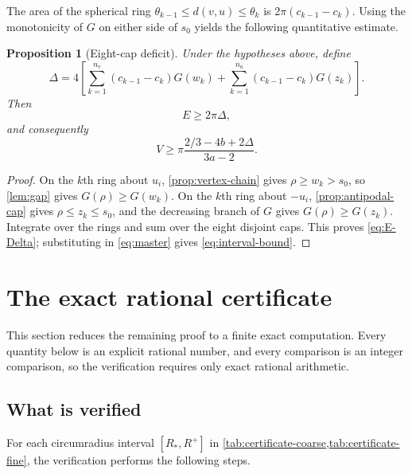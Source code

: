 \documentclass[11pt,reqno]{amsart}
\numberwithin{equation}{section}
\newtheorem{proposition}[theorem]{Proposition}
\theoremstyle{definition}
\theoremstyle{remark}
\begin{document}
The area of the spherical ring
$\theta_{k-1}\leq d(v,u)\leq\theta_k$ is
$2\pi(c_{k-1}-c_k)$. Using the monotonicity of $G$ on either side of $s_0$ yields the following quantitative estimate.

\begin{proposition}[Eight-cap deficit]\label{prop:eight-cap}
Under the hypotheses above, define
\begin{equation}\label{eq:Delta}
 \Delta=4\left[
 \sum_{k=1}^{n_v}(c_{k-1}-c_k)G(w_k)
 +\sum_{k=1}^{n_a}(c_{k-1}-c_k)G(z_k)
 \right].
\end{equation}
Then
\begin{equation}\label{eq:E-Delta}
 E\geq2\pi\Delta,
\end{equation}
and consequently
\begin{equation}\label{eq:interval-bound}
 V\geq
 \pi\frac{2/3-4b+2\Delta}{3a-2}.
\end{equation}
\end{proposition}

\begin{proof}
On the $k$th ring about $u_i$, \cref{prop:vertex-chain} gives $\rho\geq w_k>s_0$, so \cref{lem:gap} gives $G(\rho)\geq G(w_k)$. On the $k$th ring about $-u_i$, \cref{prop:antipodal-cap} gives $\rho\leq z_k\leq s_0$, and the decreasing branch of $G$ gives $G(\rho)\geq G(z_k)$. Integrate over the rings and sum over the eight disjoint caps. This proves \eqref{eq:E-Delta}; substituting in \eqref{eq:master} gives \eqref{eq:interval-bound}.
\end{proof}

\section{The exact rational certificate}\label{sec:certificate}

This section reduces the remaining proof to a finite exact computation. Every quantity below is an explicit rational number, and every comparison is an integer comparison, so the verification requires only exact rational arithmetic.

\subsection{What is verified}

For each circumradius interval $[R_{*},R^{+}]$ in \cref{tab:certificate-coarse,tab:certificate-fine}, the verification performs the following steps.
\end{document}
